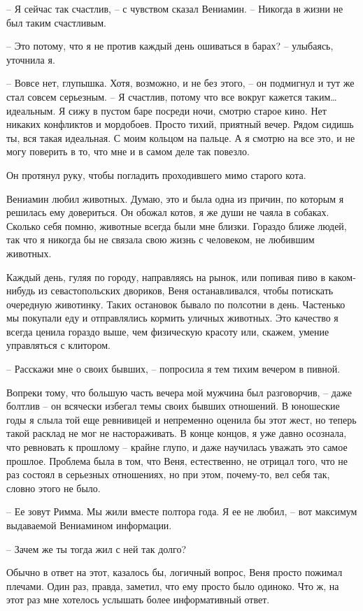\documentclass[
]{book}
\begin{document}
-- Я сейчас так счастлив, -- с чувством сказал Вениамин. -- Никогда в жизни не был таким счастливым.

-- Это потому, что я не против каждый день ошиваться в барах? -- улыбаясь, уточнила я.

-- Вовсе нет, глупышка. Хотя, возможно, и не без этого, -- он подмигнул и тут же стал совсем серьезным. -- Я счастлив, потому что все вокруг кажется таким\ldots{} идеальным. Я сижу в пустом баре посреди ночи, смотрю старое кино. Нет никаких конфликтов и мордобоев. Просто тихий, приятный вечер. Рядом сидишь ты, вся такая идеальная. С моим кольцом на пальце. А я смотрю на все это, и не могу поверить в то, что мне и в самом деле так повезло.

Он протянул руку, чтобы погладить проходившего мимо старого кота.

Вениамин любил животных. Думаю, это и была одна из причин, по которым я решилась ему довериться. Он обожал котов, я же души не чаяла в собаках. Сколько себя помню, животные всегда были мне близки. Гораздо ближе людей, так что я никогда бы не связала свою жизнь с человеком, не любившим животных.

Каждый день, гуляя по городу, направляясь на рынок, или попивая пиво в каком-нибудь из севастопольских двориков, Веня останавливался, чтобы потискать очередную животинку. Таких остановок бывало по полсотни в день. Частенько мы покупали еду и отправлялись кормить уличных животных. Это качество я всегда ценила гораздо выше, чем физическую красоту или, скажем, умение управляться с клитором.

-- Расскажи мне о своих бывших, -- попросила я тем тихим вечером в пивной.

Вопреки тому, что большую часть вечера мой мужчина был разговорчив, -- даже болтлив -- он всячески избегал темы своих бывших отношений. В юношеские годы я слыла той еще ревнивицей и непременно оценила бы этот жест, но теперь такой расклад не мог не настораживать. В конце концов, я уже давно осознала, что ревновать к прошлому -- крайне глупо, и даже научилась уважать это самое прошлое. Проблема была в том, что Веня, естественно, не отрицал того, что не раз состоял в серьезных отношениях, но при этом, почему-то, вел себя так, словно этого не было.

-- Ее зовут Римма. Мы жили вместе полтора года. Я ее не любил, -- вот максимум выдаваемой Вениамином информации.

-- Зачем же ты тогда жил с ней так долго?

Обычно в ответ на этот, казалось бы, логичный вопрос, Веня просто пожимал плечами. Один раз, правда, заметил, что ему просто было одиноко. Что ж, на этот раз мне хотелось услышать более информативный ответ.
\end{document}
